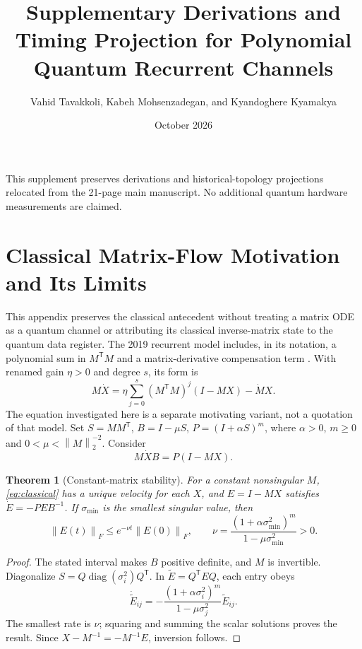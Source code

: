 \documentclass[10pt]{article}
\newtheorem{theorem}{Theorem}
\newcommand{\norm}[1]{\left\lVert #1\right\rVert}
\newcommand{\tr}{\mathsf T}
\begin{document}
\title{Supplementary Derivations and Timing Projection for Polynomial Quantum Recurrent Channels}
\author{Vahid Tavakkoli, Kabeh Mohsenzadegan, and Kyandoghere Kyamakya}
\date{October 2026}
\maketitle
\noindent This supplement preserves derivations and historical-topology projections
relocated from the 21-page main manuscript. No additional quantum hardware
measurements are claimed.\par
\appendix


\section{Classical Matrix-Flow Motivation and Its Limits}\label{sec:classicalmotivation}
This appendix preserves the classical antecedent without treating a matrix ODE as a quantum channel or attributing its classical inverse-matrix state to the quantum data register.
The 2019 recurrent model includes, in its notation, a polynomial sum in $M^{\tr}M$ and a matrix-derivative compensation term \cite[Eq. (24)]{r4}. With renamed gain $\eta>0$ and degree $s$, its form is
\begin{equation}\label{eq:2019}
M\dot X=\eta\sum_{j=0}^{s}(M^{\tr}M)^j(I-MX)-\dot M X.
\end{equation}
The equation investigated here is a separate motivating variant, not a quotation of that model. Set $S=MM^{\tr}$, $B=I-\mu S$, $P=(I+\alpha S)^m$, where $\alpha>0$, $m\ge0$ and $0<\mu<\norm M_2^{-2}$. Consider
\begin{equation}\label{eq:classical}
M\dot X B=P(I-MX).
\end{equation}
\begin{theorem}[Constant-matrix stability]\label{thm:classical}
For a constant nonsingular $M$, \eqref{eq:classical} has a unique velocity for each $X$, and $E=I-MX$ satisfies $\dot E=-PEB^{-1}$. If $\sigma_{\min}$ is the smallest singular value, then
\begin{equation}\label{eq:classicalrate}
\norm{E(t)}_F\le e^{-\nu t}\norm{E(0)}_F,\qquad
\nu=\frac{(1+\alpha\sigma_{\min}^2)^m}{1-\mu\sigma_{\min}^2}>0.
\end{equation}
\end{theorem}
\begin{proof}
The stated interval makes $B$ positive definite, and $M$ is invertible. Diagonalize $S=Q\operatorname{diag}(\sigma_i^2)Q^{\tr}$. In $\widetilde E=Q^{\tr}EQ$, each entry obeys
\[
\dot{\widetilde E}_{ij}=-\frac{(1+\alpha\sigma_i^2)^m}{1-\mu\sigma_j^2}\widetilde E_{ij}.
\]
The smallest rate is $\nu$; squaring and summing the scalar solutions proves the result. Since $X-M^{-1}=-M^{-1}E$, inversion follows.
\end{proof}
\end{document}

